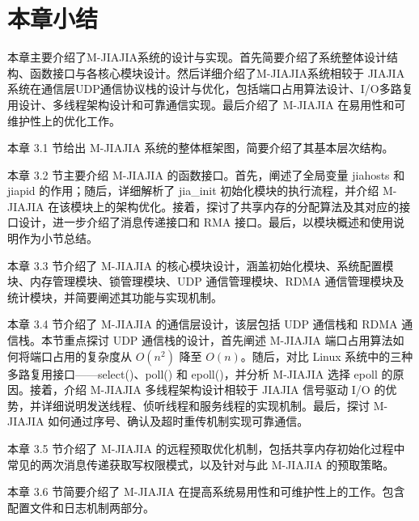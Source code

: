 {    \section{本章小结}
    本章主要介绍了M-JIAJIA系统的设计与实现。首先简要介绍了系统整体设计结构、函数接口与各核心模块设计。然后详细介绍了M-JIAJIA系统相较于 JIAJIA 系统在通信层UDP通信协议栈的设计与优化，包括端口占用算法设计、I/O多路复用设计、多线程架构设计和可靠通信实现。最后介绍了 M-JIAJIA 在易用性和可维护性上的优化工作。

    本章 3.1 节给出 M-JIAJIA 系统的整体框架图，简要介绍了其基本层次结构。

    本章 3.2 节主要介绍 M-JIAJIA 的函数接口。首先，阐述了全局变量 jiahosts 和 jiapid 的作用；随后，详细解析了 jia\_init 初始化模块的执行流程，并介绍 M-JIAJIA 在该模块上的架构优化。接着，探讨了共享内存的分配算法及其对应的接口设计，进一步介绍了消息传递接口和 RMA 接口。最后，以模块概述和使用说明作为小节总结。

    本章 3.3 节介绍了 M-JIAJIA 的核心模块设计，涵盖初始化模块、系统配置模块、内存管理模块、锁管理模块、UDP 通信管理模块、RDMA 通信管理模块及统计模块，并简要阐述其功能与实现机制。

    本章 3.4 节介绍了 M-JIAJIA 的通信层设计，该层包括 UDP 通信栈和 RDMA 通信栈。本节重点探讨 UDP 通信栈的设计，首先阐述 M-JIAJIA 端口占用算法如何将端口占用的复杂度从 $O(n^2)$ 降至 $O(n)$。随后，对比 Linux 系统中的三种多路复用接口——select()、poll() 和 epoll()，并分析 M-JIAJIA 选择 epoll 的原因。接着，介绍 M-JIAJIA 多线程架构设计相较于 JIAJIA 信号驱动 I/O 的优势，并详细说明发送线程、侦听线程和服务线程的实现机制。最后，探讨 M-JIAJIA 如何通过序号、确认及超时重传机制实现可靠通信。

    本章 3.5 节介绍了 M-JIAJIA 的远程预取优化机制，包括共享内存初始化过程中常见的两次消息传递获取写权限模式，以及针对与此 M-JIAJIA 的预取策略。

    本章 3.6 节简要介绍了 M-JIAJIA 在提高系统易用性和可维护性上的工作。包含配置文件和日志机制两部分。

}
